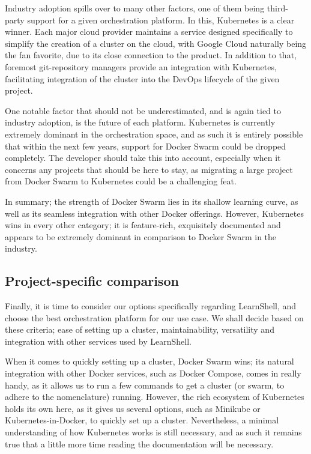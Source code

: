 \documentclass[thesis=B,english]{FITthesis}[2019/12/23]
\begin{document}
Industry adoption spills over to many other factors, one of them being third-party support for a given orchestration platform. In this, Kubernetes is a clear winner. Each major cloud provider maintains a service designed specifically to simplify the creation of a cluster on the cloud, with Google Cloud naturally being the fan favorite, due to its close connection to the product. In addition to that, foremost git-repository managers provide an integration with Kubernetes, facilitating integration of the cluster into the DevOps lifecycle of the given project.

One notable factor that should not be underestimated, and is again tied to industry adoption, is the future of each platform. Kubernetes is currently extremely dominant in the orchestration space, and as such it is entirely possible that within the next few years, support for Docker Swarm could be dropped completely. The developer should take this into account, especially when it concerns any projects that should be here to stay, as migrating a large project from Docker Swarm to Kubernetes could be a challenging feat.

In summary; the strength of Docker Swarm lies in its shallow learning curve, as well as its seamless integration with other Docker offerings. However, Kubernetes wins in every other category; it is feature-rich, exquisitely documented and appears to be extremely dominant in comparison to Docker Swarm in the industry.

\subsection{Project-specific comparison}

Finally, it is time to consider our options specifically regarding LearnShell, and choose the best orchestration platform for our use case. We shall decide based on these criteria; ease of setting up a cluster, maintainability, versatility and integration with other services used by LearnShell.

When it comes to quickly setting up a cluster, Docker Swarm wins; its natural integration with other Docker services, such as Docker Compose, comes in really handy, as it allows us to run a few commands to get a cluster (or swarm, to adhere to the nomenclature) running. However, the rich ecosystem of Kubernetes holds its own here, as it gives us several options, such as Minikube or Kubernetes-in-Docker, to quickly set up a cluster. Nevertheless, a minimal understanding of how Kubernetes works is still necessary, and as such it remains true that a little more time reading the documentation will be necessary.
\end{document}
